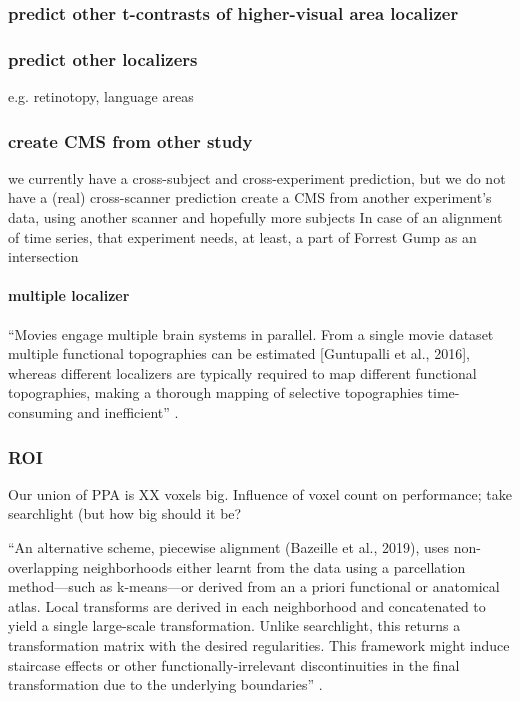 
\subsubsection{predict other t-contrasts of higher-visual area localizer}

\subsubsection{predict other localizers}
%
e.g. retinotopy, language areas


\subsubsection{create CMS from other study}
%
we currently have a cross-subject and cross-experiment prediction,
but we do not have a (real) cross-scanner prediction
%
create a CMS from another experiment’s data,
using another scanner and hopefully more subjects
%
In case of an alignment of time series,
that experiment needs, at least, a part of Forrest Gump as an intersection


\paragraph{multiple localizer}
%
``Movies engage multiple brain systems in parallel. From a single movie dataset
multiple functional topographies can be estimated [Guntupalli et al., 2016],
whereas different localizers are typically required to map different functional
topographies, making a thorough mapping of selective topographies time-consuming
and inefficient'' \citep{jiahui2020predicting}.


\subsubsection{ROI}

%
Our union of PPA is XX voxels big.
%
Influence of voxel count on performance; take searchlight (but how big should it
be?

``An alternative scheme, piecewise alignment (Bazeille et al., 2019), uses
non-overlapping neighborhoods either learnt from the data using a parcellation
method—such as k-means—or derived from an a priori functional or anatomical
atlas. Local transforms are derived in each neighborhood and concatenated to
yield a single large-scale transformation. Unlike searchlight, this returns a
transformation matrix with the desired regularities. This framework might
induce staircase effects or other functionally-irrelevant discontinuities in the
final transformation due to the underlying boundaries''
\citep{bazeille2021empirical}.

